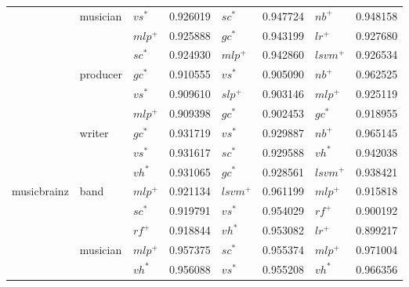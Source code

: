 \documentclass[epsfig,a4paper,11pt,titlepage,twoside,openany]{book}
\begin{document}
\begin{table}[H]
\begin{tabular}{|l|l|ll|ll|ll|}
                             & \multirow{3}{*}{musician} & $vs^*$    & 0.926019 & $sc^*$    & 0.947724  & $nb^+$                   & 0.948158    \\
                             &                           & $mlp^+$   & 0.925888 & $gc^*$    & 0.943199  & $lr^+$ & 0.927680    \\
                             &                           & $sc^*$    & 0.924930 & $mlp^+$   & 0.942860  & $lsvm^+$                 & 0.926534    \\ \cline{2-8} 
                             & \multirow{3}{*}{producer} & $gc^*$    & 0.910555 & $vs^*$    & 0.905090  & $nb^+$                   & 0.962525    \\
                             &                           & $vs^*$    & 0.909610 & $slp^+$   & 0.903146  & $mlp^+$                  & 0.925119    \\
                             &                           & $mlp^+$   & 0.909398 & $gc^*$    & 0.902453  & $gc^*$                   & 0.918955    \\ \cline{2-8} 
                             & \multirow{3}{*}{writer}   & $gc^*$    & 0.931719 & $vs^*$    & 0.929887  & $nb^+$                   & 0.965145    \\
                             &                           & $vs^*$    & 0.931617 & $sc^*$    & 0.929588  & $vh^*$                   & 0.942038    \\
                             &                           & $vh^*$    & 0.931065 & $gc^*$    & 0.928561  & $lsvm^+$                 & 0.938421    \\ \hline
\multirow{6}{*}{musicbrainz} & \multirow{3}{*}{band}     & $mlp^+$   & 0.921134 & $lsvm^+$  & 0.961199  & $mlp^+$                  & 0.915818    \\
                             &                           & $sc^*$    & 0.919791 & $vs^*$    & 0.954029  & $rf^+$                   & 0.900192    \\
                             &                           & $rf^+$    & 0.918844 & $vh^*$    & 0.953082  & $lr^+$                   & 0.899217    \\ \cline{2-8} 
                             & \multirow{3}{*}{musician} & $mlp^+$   & 0.957375 & $sc^*$    & 0.955374  & $mlp^+$                  & 0.971004    \\
                             &                           & $vh^*$    & 0.956088 & $vs^*$    & 0.955208  & $vh^*$                   & 0.966356    \\

\end{tabular}
\end{table}
\end{document}
